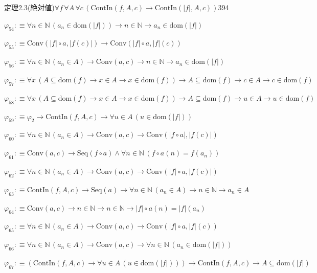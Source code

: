 \begin{fullproof}{定理2.3(絶対値)}{$\forall f\,\forall A\,\forall c\,(\mathrm{ContIn}(f,A,c) \to \mathrm{ContIn}(\lvert f \rvert,A,c))$}{394}
\begin{abbrevlist}
\item $\varphi_{54} :\equiv \forall n \in \mathbb{N}\,(a_{n} \in \mathrm{dom}(\lvert f \rvert)) \to n \in \mathbb{N} \to a_{n} \in \mathrm{dom}(\lvert f \rvert)$
\item $\varphi_{55} :\equiv \mathrm{Conv}(\lvert f \rvert \circ a,\lvert f(c) \rvert) \to \mathrm{Conv}(\lvert f \rvert \circ a,\lvert f \rvert(c))$
\item $\varphi_{56} :\equiv \forall n \in \mathbb{N}\,(a_{n} \in A) \to \mathrm{Conv}(a,c) \to n \in \mathbb{N} \to a_{n} \in \mathrm{dom}(\lvert f \rvert)$
\item $\varphi_{57} :\equiv \forall x\,(A \subseteq \mathrm{dom}(f) \to x \in A \to x \in \mathrm{dom}(f)) \to A \subseteq \mathrm{dom}(f) \to c \in A \to c \in \mathrm{dom}(f)$
\item $\varphi_{58} :\equiv \forall x\,(A \subseteq \mathrm{dom}(f) \to x \in A \to x \in \mathrm{dom}(f)) \to A \subseteq \mathrm{dom}(f) \to u \in A \to u \in \mathrm{dom}(f)$
\item $\varphi_{59} :\equiv \varphi_{2} \to \mathrm{ContIn}(f,A,c) \to \forall u \in A\,(u \in \mathrm{dom}(\lvert f \rvert))$
\item $\varphi_{60} :\equiv \forall n \in \mathbb{N}\,(a_{n} \in A) \to \mathrm{Conv}(a,c) \to \mathrm{Conv}(\lvert f \circ a \rvert,\lvert f(c) \rvert)$
\item $\varphi_{61} :\equiv \mathrm{Conv}(a,c) \to \mathrm{Seq}(f \circ a) \land \forall n \in \mathbb{N}\,(f \circ a(n) = f(a_{n}))$
\item $\varphi_{62} :\equiv \forall n \in \mathbb{N}\,(a_{n} \in A) \to \mathrm{Conv}(a,c) \to \mathrm{Conv}(\lvert f \rvert \circ a,\lvert f(c) \rvert)$
\item $\varphi_{63} :\equiv \mathrm{ContIn}(f,A,c) \to \mathrm{Seq}(a) \to \forall n \in \mathbb{N}\,(a_{n} \in A) \to n \in \mathbb{N} \to a_{n} \in A$
\item $\varphi_{64} :\equiv \mathrm{Conv}(a,c) \to n \in \mathbb{N} \to n \in \mathbb{N} \to \lvert f \rvert \circ a(n) = \lvert f \rvert(a_{n})$
\item $\varphi_{65} :\equiv \forall n \in \mathbb{N}\,(a_{n} \in A) \to \mathrm{Conv}(a,c) \to \mathrm{Conv}(\lvert f \rvert \circ a,\lvert f \rvert(c))$
\item $\varphi_{66} :\equiv \forall n \in \mathbb{N}\,(a_{n} \in A) \to \mathrm{Conv}(a,c) \to \forall n \in \mathbb{N}\,(a_{n} \in \mathrm{dom}(\lvert f \rvert))$
\item $\varphi_{67} :\equiv (\mathrm{ContIn}(f,A,c) \to \forall u \in A\,(u \in \mathrm{dom}(\lvert f \rvert))) \to \mathrm{ContIn}(f,A,c) \to A \subseteq \mathrm{dom}(\lvert f \rvert)$

\end{abbrevlist}
\end{fullproof}
